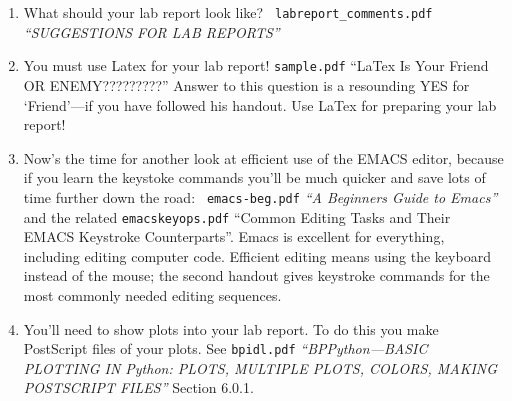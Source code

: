 \documentclass[12pt,preprint]{aastex}
\begin{document}
\begin{enumerate}
\item What should your lab report look like? {\tt
  labreport\_comments.pdf} {\it ``SUGGESTIONS FOR LAB REPORTS''}

\item You must use Latex for your lab report! {\tt sample.pdf} ``LaTex
  Is Your Friend OR ENEMY?????????'' Answer to this question is a
  resounding YES for `Friend'---if you have followed his handout. Use
  LaTex for preparing your lab report!

\item Now's the time for another look at efficient use of the EMACS
  editor, because if you learn the keystoke commands you'll be much
  quicker and save lots of time further down the road: {\tt
    emacs-beg.pdf} {\it ``A Beginners Guide to Emacs''} and the related
  {\tt emacskeyops.pdf} ``Common Editing Tasks and Their EMACS Keystroke
  Counterparts''. Emacs is excellent for everything, including editing
  computer code. Efficient editing means using the keyboard
  instead of the mouse; the second handout gives keystroke commands for
  the most commonly needed editing sequences.

\item You'll need to show plots into your lab report. To do this you
  make PostScript files of your plots. See {\tt bpidl.pdf} {\it ``BPPython---BASIC PLOTTING IN
  Python: PLOTS, MULTIPLE PLOTS, COLORS, MAKING POSTSCRIPT FILES''} Section 6.0.1.

\end{enumerate}
\end{document}
